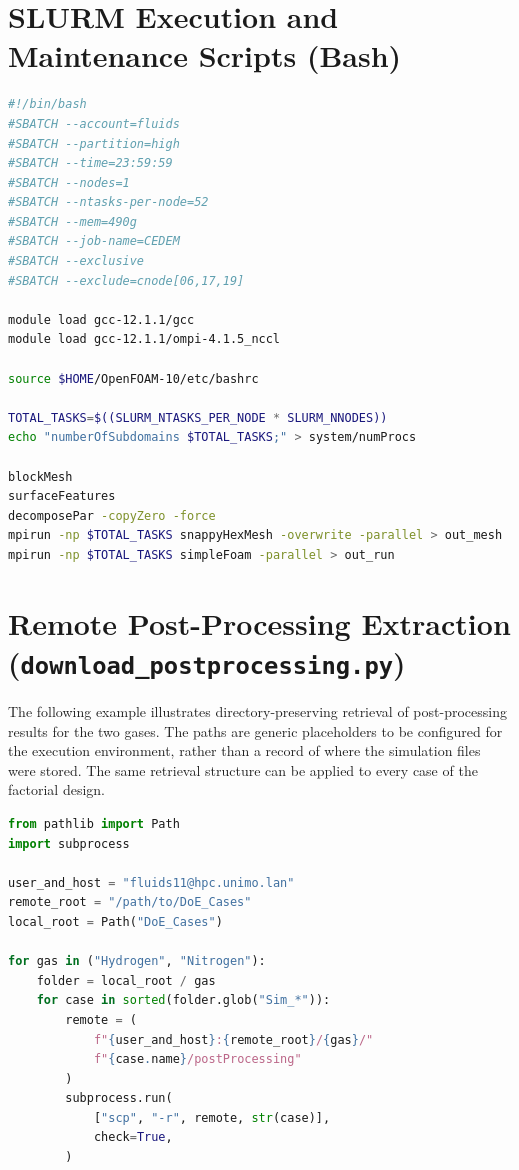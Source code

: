 \section{SLURM Execution and Maintenance Scripts (Bash)}
\label{sec:app_slurm_scripts}
\begin{lstlisting}[language=bash, caption={Full meshing and solving SLURM submission script (\texttt{run\_aries.sh}).}, captionpos=b]
#!/bin/bash
#SBATCH --account=fluids
#SBATCH --partition=high
#SBATCH --time=23:59:59
#SBATCH --nodes=1
#SBATCH --ntasks-per-node=52
#SBATCH --mem=490g
#SBATCH --job-name=CEDEM
#SBATCH --exclusive
#SBATCH --exclude=cnode[06,17,19]

module load gcc-12.1.1/gcc
module load gcc-12.1.1/ompi-4.1.5_nccl

source $HOME/OpenFOAM-10/etc/bashrc

TOTAL_TASKS=$((SLURM_NTASKS_PER_NODE * SLURM_NNODES))
echo "numberOfSubdomains $TOTAL_TASKS;" > system/numProcs

blockMesh
surfaceFeatures
decomposePar -copyZero -force
mpirun -np $TOTAL_TASKS snappyHexMesh -overwrite -parallel > out_mesh
mpirun -np $TOTAL_TASKS simpleFoam -parallel > out_run
\end{lstlisting} %

\section{Remote Post-Processing Extraction (\texttt{download\_postprocessing.py})}
\label{sec:app_scp_script}
The following example illustrates directory-preserving retrieval of post-processing results for the two gases. The paths are generic placeholders to be configured for the execution environment, rather than a record of where the simulation files were stored. The same retrieval structure can be applied to every case of the factorial design.

\begin{lstlisting}[language=Python,caption={Illustrative SCP retrieval of each case's post-processing output.}, captionpos=b]
from pathlib import Path
import subprocess

user_and_host = "fluids11@hpc.unimo.lan"
remote_root = "/path/to/DoE_Cases"
local_root = Path("DoE_Cases")

for gas in ("Hydrogen", "Nitrogen"):
    folder = local_root / gas
    for case in sorted(folder.glob("Sim_*")):
        remote = (
            f"{user_and_host}:{remote_root}/{gas}/"
            f"{case.name}/postProcessing"
        )
        subprocess.run(
            ["scp", "-r", remote, str(case)],
            check=True,
        )
\end{lstlisting}

